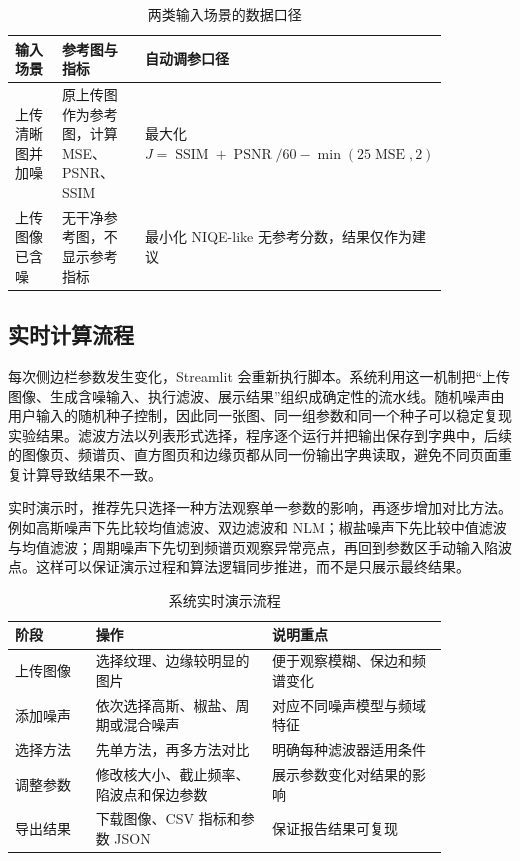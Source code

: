 \documentclass[UTF8,a4paper,12pt]{ctexart}
\begin{document}
\begin{table}[H]
\centering
\caption{两类输入场景的数据口径}
\begin{tabular}{p{0.24\linewidth}p{0.31\linewidth}p{0.31\linewidth}}
\toprule
输入场景 & 参考图与指标 & 自动调参口径 \\
\midrule
上传清晰图并加噪 & 原上传图作为参考图，计算 MSE、PSNR、SSIM & 最大化 $J=\operatorname{SSIM}+\operatorname{PSNR}/60-\min(25\operatorname{MSE},2)$ \\
上传图像已含噪 & 无干净参考图，不显示参考指标 & 最小化 NIQE-like 无参考分数，结果仅作为建议 \\
\bottomrule
\end{tabular}
\end{table}

\subsection{实时计算流程}

每次侧边栏参数发生变化，Streamlit 会重新执行脚本。系统利用这一机制把“上传图像、生成含噪输入、执行滤波、展示结果”组织成确定性的流水线。随机噪声由用户输入的随机种子控制，因此同一张图、同一组参数和同一个种子可以稳定复现实验结果。滤波方法以列表形式选择，程序逐个运行并把输出保存到字典中，后续的图像页、频谱页、直方图页和边缘页都从同一份输出字典读取，避免不同页面重复计算导致结果不一致。

实时演示时，推荐先只选择一种方法观察单一参数的影响，再逐步增加对比方法。例如高斯噪声下先比较均值滤波、双边滤波和 NLM；椒盐噪声下先比较中值滤波与均值滤波；周期噪声下先切到频谱页观察异常亮点，再回到参数区手动输入陷波点。这样可以保证演示过程和算法逻辑同步推进，而不是只展示最终结果。

\begin{table}[H]
\centering
\caption{系统实时演示流程}
\begin{tabular}{p{0.16\linewidth}p{0.35\linewidth}p{0.35\linewidth}}
\toprule
阶段 & 操作 & 说明重点 \\
\midrule
上传图像 & 选择纹理、边缘较明显的图片 & 便于观察模糊、保边和频谱变化 \\
添加噪声 & 依次选择高斯、椒盐、周期或混合噪声 & 对应不同噪声模型与频域特征 \\
选择方法 & 先单方法，再多方法对比 & 明确每种滤波器适用条件 \\
调整参数 & 修改核大小、截止频率、陷波点和保边参数 & 展示参数变化对结果的影响 \\
导出结果 & 下载图像、CSV 指标和参数 JSON & 保证报告结果可复现 \\
\bottomrule
\end{tabular}
\end{table}
\end{document}
